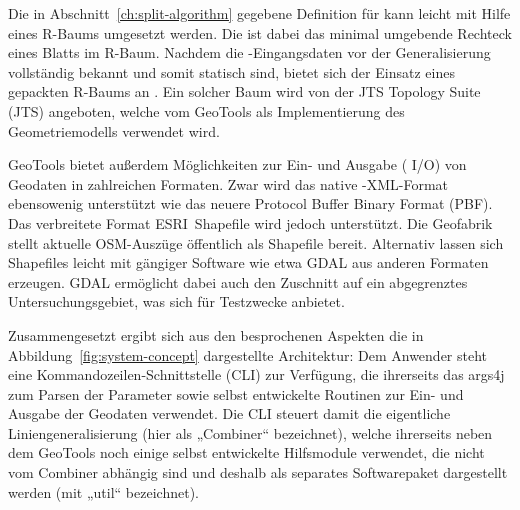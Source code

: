 \documentclass[../main/thesis.tex]{subfiles}
\begin{document}
Die in Abschnitt~\ref{ch:split-algorithm} gegebene Definition für  kann leicht mit Hilfe eines R-Baums umgesetzt werden.
Die  ist dabei das minimal umgebende Rechteck eines Blatts im R-Baum.
Nachdem die \osm-Eingangsdaten vor der Generalisierung vollständig bekannt und somit statisch sind, bietet sich der Einsatz eines gepackten R-Baums an .
Ein solcher Baum wird von der JTS Topology Suite (JTS) angeboten, welche vom  GeoTools als Implementierung des Geometriemodells verwendet wird.

GeoTools bietet außerdem Möglichkeiten zur Ein- und Ausgabe ( I/O) von Geodaten in zahlreichen Formaten.
Zwar wird das native \osm-XML-Format ebensowenig unterstützt wie das neuere Protocol Buffer Binary Format (PBF).
Das verbreitete Format ESRI~Shapefile wird jedoch unterstützt.
Die Geofabrik stellt aktuelle OSM-Auszüge öffentlich als Shapefile bereit.
Alternativ lassen sich Shapefiles leicht mit gängiger Software wie etwa GDAL aus anderen Formaten erzeugen.
GDAL ermöglicht dabei auch den Zuschnitt auf ein abgegrenztes Untersuchungsgebiet, was sich für Testzwecke anbietet.


Zusammengesetzt ergibt sich aus den besprochenen Aspekten die in Abbildung~\ref{fig:system-concept} dargestellte Architektur:
Dem Anwender steht eine Kommandozeilen-Schnittstelle (CLI) zur Verfügung, die ihrerseits das  args4j zum Parsen der Parameter sowie selbst entwickelte Routinen zur Ein- und Ausgabe der Geodaten verwendet.
Die CLI steuert damit die eigentliche Liniengeneralisierung (hier als „Combiner“ bezeichnet), welche ihrerseits neben dem  GeoTools noch einige selbst entwickelte Hilfsmodule verwendet, die nicht vom Combiner abhängig sind und deshalb als separates Softwarepaket dargestellt werden (mit „util“ bezeichnet).
\end{document}
